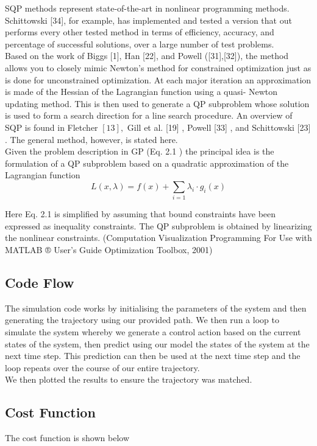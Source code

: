 \documentclass{UoNMCHA}
\numberwithin{equation}{section}
\begin{document}
	SQP methods represent state-of-the-art in nonlinear programming methods. Schittowski [34], for
	example, has implemented and tested a version that out performs every other tested method in terms of
	efficiency, accuracy, and percentage of successful solutions, over a large number of test problems.\\
	Based on the work of Biggs [1], Han [22], and Powell ([31],[32]), the method allows you to closely
	mimic Newton's method for constrained optimization just as is done for unconstrained optimization. At
	each major iteration an approximation is made of the Hessian of the Lagrangian function using a quasi-
	Newton updating method. This is then used to generate a QP subproblem whose solution is used to
	form a search direction for a line search procedure. An overview of SQP is found in Fletcher $[13],$ Gill
	et al. [19] , Powell [33] , and Schittowski [23] . The general method, however, is stated here.\\
	
	Given the problem description in GP (Eq. 2.1 ) the principal idea is the formulation of a QP subproblem
	based on a quadratic approximation of the Lagrangian function
	$$
	L(x, \lambda)=f(x)+\sum_{i=1} \lambda_{i} \cdot g_{i}(x)
	$$
	
	Here Eq. 2.1 is simplified by assuming that bound constraints have been expressed as inequality constraints. The QP subproblem is obtained by linearizing the nonlinear constraints.  (Computation Visualization Programming For Use with MATLAB ® User’s Guide Optimization Toolbox, 2001) \\
	
	\newpage
	\subsection*{Code Flow}
	The simulation code works by initialising the parameters of the system and then generating the trajectory using our provided path. We then run a loop to simulate the system whereby we generate a control action based on the current states of the system, then predict using our model the states of the system at the next time step. This prediction can then be used at the next time step and the loop repeats over the course of our entire trajectory. \\	
	We then plotted the results to ensure the trajectory was matched.
	
	\subsection*{Cost Function}
	The cost function is shown below
	
\end{document}
